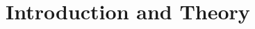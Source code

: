 \documentclass[11pt,a4paper,twoside]{article}
\begin{document}

\cleardoublepage

\setcounter{page}{1}
\fancyhead[LE,RO]{\rightmark}
\fancyhead[LO,RE]{\leftmark}
\fancyfoot[LE,RO]{\thepage}



\chapter{Introduction and Theory}

    

    

\cleardoublepage %

    


\cleardoublepage

    


\cleardoublepage

    


\cleardoublepage

    



\cleardoublepage

    



\cleardoublepage

    
\end{document}
